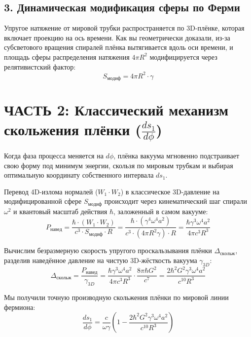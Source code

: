\documentclass[12pt,a4paper]{article}
\begin{document}
\subsection*{3. Динамическая модификация сферы по Ферми}

Упругое натяжение от мировой трубки распространяется по 3D-плёнке, которая включает проекцию на ось времени. Как вы геометрически доказали, из-за субсветового вращения спиралей плёнка вытягивается вдоль оси времени, и площадь сферы распределения натяжения $4\pi R^2$ модифицируется через релятивистский фактор:
\begin{equation}
S_{модиф} = 4\pi R^2 \cdot \gamma
\end{equation}

\section*{ЧАСТЬ 2: Классический механизм скольжения плёнки ($\frac{ds_1}{d\phi}$)}

Когда фаза процесса меняется на $d\phi$, плёнка вакуума мгновенно подстраивает свою форму под минимум энергии, скользя по мировым трубкам и выбирая оптимальную координату собственного интервала $ds_1$.

Перевод 4D-излома нормалей ($W_1 \cdot W_2$) в классическое 3D-давление на модифицированной сфере $S_{модиф}$ происходит через кинематический шаг спирали $\omega^2$ и квантовый масштаб действия $\hbar$, заложенный в самом вакууме:
\begin{equation}
P_{навед} = \frac{\hbar \cdot (W_1 \cdot W_2)}{c^3 \cdot S_{модиф} \cdot R} = \frac{\hbar \cdot (\gamma^4 \omega^4 a^2)}{c^3 \cdot (4\pi R^2 \gamma) \cdot R} = \frac{\hbar \gamma^3 \omega^4 a^2}{4\pi c^3 R^3}
\end{equation}

Вычислим безразмерную скорость упругого проскальзывания плёнки $\Delta_{скольж}$, разделив наведённое давление на чистую 3D-жёсткость вакуума $\gamma_{3D}$:
\begin{equation}
\Delta_{скольж} = \frac{P_{навед}}{\gamma_{3D}} = \frac{\hbar \gamma^3 \omega^4 a^2}{4\pi c^3 R^3} \cdot \frac{8\pi \hbar G^2}{c^7} = \frac{2 \hbar^2 G^2 \gamma^3 \omega^4 a^2}{c^{10} R^3}
\end{equation}

Мы получили точную производную скольжения плёнки по мировой линии фермиона:
\begin{equation}
\frac{ds_1}{d\phi} = \frac{c}{\omega \gamma} \left( 1 - \frac{2 \hbar^2 G^2 \gamma^3 \omega^4 a^2}{c^{10} R^3} \right)
\end{equation}
\end{document}
